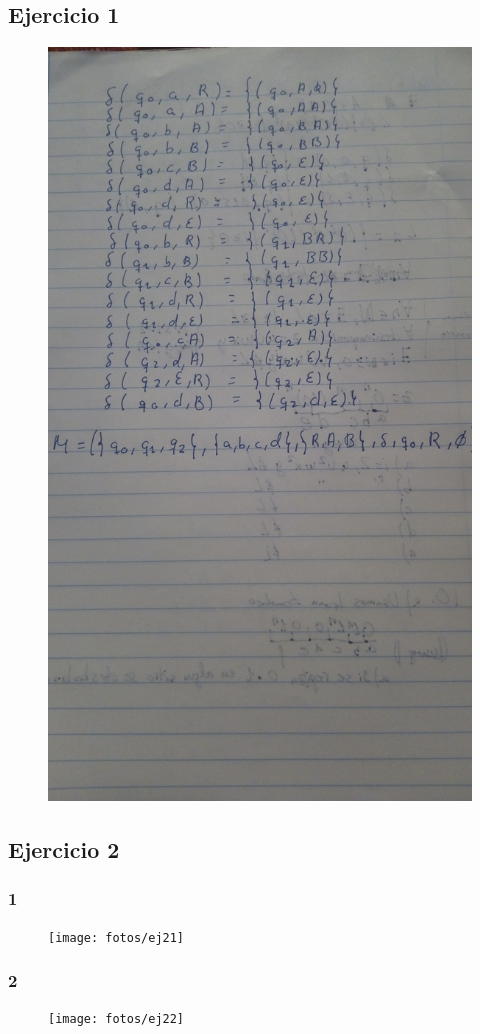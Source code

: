 \documentclass{article}
\begin{document}
\subsection{ Ejercicio 1}
\begin{figure}[H]
  \centering
  \includegraphics[scale=0.1]{fotos/ej1}
\end{figure}
\subsection{Ejercicio 2}
  \subsubsection{1}
  \begin{figure}[H]
    \centering
    \texttt{[image: fotos/ej21]}
  \end{figure}
  \subsubsection{2}
  \begin{figure}[H]
    \centering
    \texttt{[image: fotos/ej22]}
  \end{figure}
\end{document}

